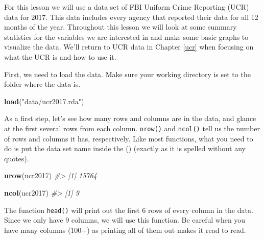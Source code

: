\documentclass[
  12pt,
]{book}
\newenvironment{Shaded}{\begin{snugshade}}{\end{snugshade}}
\newcommand{\CommentTok}[1]{\textcolor[rgb]{0.37,0.37,0.37}{\textit{#1}}}
\newcommand{\KeywordTok}[1]{\textcolor[rgb]{0.27,0.27,0.27}{\textbf{#1}}}
\newcommand{\NormalTok}[1]{#1}
\newcommand{\StringTok}[1]{\textcolor[rgb]{0.5,0.5,0.5}{#1}}
\begin{document}
For this lesson we will use a data set of FBI Uniform Crime Reporting (UCR) data for 2017. This data includes every agency that reported their data for all 12 months of the year. Throughout this lesson we will look at some summary statistics for the variables we are interested in and make some basic graphs to visualize the data. We'll return to UCR data in Chapter \ref{ucr} when focusing on what the UCR is and how to use it.

First, we need to load the data. Make sure your working directory is set to the folder where the data is.

\begin{Shaded}
\begin{Highlighting}[]
\KeywordTok{load}\NormalTok{(}\StringTok{"data/ucr2017.rda"}\NormalTok{)}
\end{Highlighting}
\end{Shaded}

As a first step, let's see how many rows and columns are in the data, and glance at the first several rows from each column. \texttt{nrow()} and \texttt{ncol()} tell us the number of rows and columns it has, respectively. Like most functions, what you need to do is put the data set name inside the () (exactly as it is spelled without any quotes).

\begin{Shaded}
\begin{Highlighting}[]
\KeywordTok{nrow}\NormalTok{(ucr2017)}
\CommentTok{\#\textgreater{} [1] 15764}
\end{Highlighting}
\end{Shaded}

\begin{Shaded}
\begin{Highlighting}[]
\KeywordTok{ncol}\NormalTok{(ucr2017)}
\CommentTok{\#\textgreater{} [1] 9}
\end{Highlighting}
\end{Shaded}

The function \texttt{head()} will print out the first 6 rows of every column in the data. Since we only have 9 columns, we will use this function. Be careful when you have many columns (100+) as printing all of them out makes it read to read.
\end{document}
